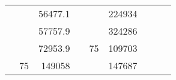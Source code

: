 \begin{table}[H]
\begin{tabular}{|ccrccrccc}
\multicolumn{1}{|c|}{\cellcolor[HTML]{FFFFC7}}                                & \multicolumn{1}{c|}{\cellcolor[HTML]{DAE8FC}}                      & \multicolumn{1}{r|}{\cellcolor[HTML]{DAE8FC}56477.1}   & \multicolumn{1}{c|}{\cellcolor[HTML]{FFFFC7}}                                & \multicolumn{1}{c|}{\cellcolor[HTML]{DAE8FC}}                       & \multicolumn{1}{r|}{\cellcolor[HTML]{DDFDFF}224934}    &                                                                              &                                                                    &                                                        \\ \cline{3-3} \cline{6-6}
\multicolumn{1}{|c|}{\cellcolor[HTML]{FFFFC7}}                                & \multicolumn{1}{c|}{\cellcolor[HTML]{DAE8FC}}                      & \multicolumn{1}{r|}{\cellcolor[HTML]{DDFDFF}57757.9}   & \multicolumn{1}{c|}{\cellcolor[HTML]{FFFFC7}}                                & \multicolumn{1}{c|}{\cellcolor[HTML]{DAE8FC}}                       & \multicolumn{1}{r|}{\cellcolor[HTML]{DAE8FC}324286}    &                                                                              &                                                                    &                                                        \\ \cline{3-3} \cline{6-6}
\multicolumn{1}{|c|}{\cellcolor[HTML]{FFFFC7}}                                & \multicolumn{1}{c|}{\cellcolor[HTML]{DAE8FC}}                      & \multicolumn{1}{r|}{\cellcolor[HTML]{DAE8FC}72953.9}   & \multicolumn{1}{c|}{\cellcolor[HTML]{FFFFC7}}                                & \multicolumn{1}{c|}{\multirow{-10}{*}{\cellcolor[HTML]{DAE8FC}75}}  & \multicolumn{1}{r|}{\cellcolor[HTML]{DDFDFF}109703}    &                                                                              &                                                                    &                                                        \\ \cline{3-3} \cline{5-6}
\multicolumn{1}{|c|}{\cellcolor[HTML]{FFFFC7}}                                & \multicolumn{1}{c|}{\multirow{-10}{*}{\cellcolor[HTML]{DAE8FC}75}} & \multicolumn{1}{r|}{\cellcolor[HTML]{DDFDFF}149058}    & \multicolumn{1}{c|}{\cellcolor[HTML]{FFFFC7}}                                & \multicolumn{1}{c|}{\cellcolor[HTML]{DDFDFF}}                       & \multicolumn{1}{r|}{\cellcolor[HTML]{DAE8FC}147687}    &                                                                              &                                                                    &                                                        \\ \cline{2-3} \cline{6-6}

\end{tabular}
\end{table}
